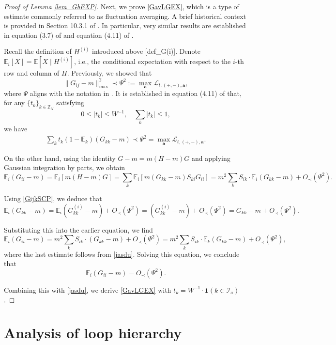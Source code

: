\documentclass[10pt,reqno]{article}
\theoremstyle{plain} %
\theoremstyle{remark}
\numberwithin{equation}{section}
\begin{document}
\begin{proof}[Proof of Lemma \ref{lem_GbEXP}]
Next, we prove \eqref{GavLGEX}, which is a type of estimate commonly referred to as fluctuation averaging. A brief historical context is provided in Section 10.3.1 of \cite{erdHos2017dynamical}. In particular, very similar results are established in equation (3.7) of \cite{Average_fluc} and equation (4.11) of \cite{erdHos2013local}. 

Recall the definition of $H^{(i)}$ introduced above \eqref{def_G(i)}. Denote $\mathbb{E}_i[X] = \mathbb{E}[X \mid H^{(i)}]$, i.e., the conditional expectation with respect to the $i$-th row and column of $H$. Previously, we showed that 
\[
\|G_{ij} - m\|_{\max}^2 \prec \Psi^2 := \max_{\mathbf{a}} \mathcal{L}_{t, (+,-), \mathbf{a}},
\]
where $\Psi$ aligns with the notation in \cite{erdHos2013local}. It is established in equation (4.11) of \cite{erdHos2013local} that, for any $\{t_k\}_{k \in \mathbb{Z}_N}$ satisfying 
\[
0 \leq \left|t_k\right| \leq W^{-1}, \quad \sum_k \left|t_k\right| \leq 1,
\]
we have
\begin{align} \label{jasdu}
\sum_k t_k (1 - \mathbb{E}_k)(G_{kk} - m) \prec \Psi^2 = \max_{\mathbf{a}} \mathcal{L}_{t, (+,-), \mathbf{a}}.
\end{align}

On the other hand, using the identity $G - m = m(H - m)G$ and applying Gaussian integration by parts, we obtain 
\[
\mathbb{E}_i(G_{ii} - m) = \mathbb{E}_i[m(H - m)G] = \sum_k \mathbb{E}_i[m(G_{kk} - m) S_{ki} G_{ii}] = m^2 \sum_k S_{ik} \cdot \mathbb{E}_i(G_{kk} - m) + O_\prec(\Psi^2).
\]

Using \eqref{GijkSCP}, we deduce that
\[
\mathbb{E}_i(G_{kk} - m) = \mathbb{E}_i(G_{kk}^{(i)} - m) + O_\prec(\Psi^2) = (G_{kk}^{(i)} - m) + O_\prec(\Psi^2) = G_{kk} - m + O_\prec(\Psi^2).
\]

Substituting this into the earlier equation, we find
\[
\mathbb{E}_i(G_{ii} - m) = m^2 \sum_k S_{ik} \cdot (G_{kk} - m) + O_\prec(\Psi^2) 
= m^2 \sum_k S_{ik} \cdot \mathbb{E}_k(G_{kk} - m) + O_\prec(\Psi^2),
\]
where the last estimate follows from \eqref{jasdu}. Solving this equation, we conclude that
\[
\mathbb{E}_i(G_{ii} - m) = O_\prec(\Psi^2).
\]

Combining this with \eqref{jasdu}, we derive \eqref{GavLGEX} with $t_k = W^{-1}\cdot \mathbf{1}(k \in \mathcal{I}_a)$.




 \end{proof}

\section{Analysis of loop hierarchy}\label{Sec:Stoflo}
\end{document}
